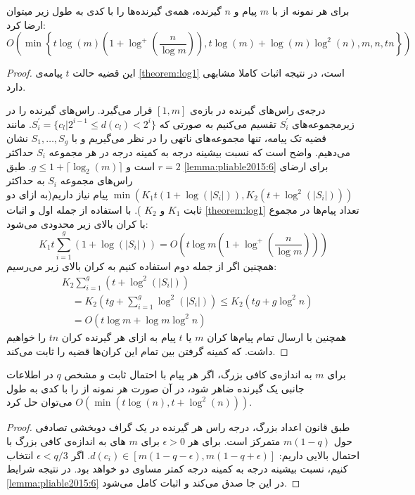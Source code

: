 \begin{theorem}
	\cite{pliable2015paper}
	\label{thm:pliable2015_7}
	برای هر نمونه از
	با
	$m$
	پیام و
	$n$
	گیرنده، همه‌ی گیرنده‌ها را با کدی به طول زیر میتوان ارضا کرد:
	\begin{equation}
		O\left( \min\left\{ t \log(m) (1 + \log^{+}(\dfrac{n}{\log m})), t \log(m) + \log(m) \log^2(n), m, n, tn\right\}\right)
	\end{equation}
\end{theorem}
\begin{proof}
	این قضیه حالت
	$t$
	پیامه‌ی
	\autoref{theorem:log1}
	است، در نتیجه اثبات کاملا مشابهی دارد.
	
	درجه‌ی راس‌های گیرنده در بازه‌ی
	$[1, m]$
	قرار می‌گیرد. راس‌های گیرنده را در زیرمجموعه‌های
	$S_i^{'}$
	تقسیم می‌کنیم به صورتی که
	$S_i^{'} = \{c_l | 2^{i - 1} \leq d(c_l) < 2^i \}$.
	مانند قضیه تک پیامه، تنها مجموعه‌های ناتهی را در نظر می‌گیریم و با
	$S_1, \ldots, S_g$
	نشان می‌دهیم. واضح است که نسبت بیشینه درجه به کمینه درجه در هر مجموعه
	$S_i$
	حداکثر
	$r = 2$
	است و
	$g \leq 1 + \lceil\log_2(m)\rceil$.
	طبق
	\autoref{lemma:pliable2015:6}
	برای ارضای راس‌های مجموعه‌
	$S_i$
	به حداکثر
	$\min (K_1 t (1 + \log(|S_i|)), K_2(t + \log^2(|S_i|)))$
	پیام نیاز داریم(به ازای دو ثابت 
	$K_1$
	و
	$K_2$
	). با استفاده از جمله اول و اثبات
	\autoref{theorem:log1}
	تعداد پیام‌ها در مجموع با کران بالای زیر محدودی می‌شود:
	$$
	K_1 t \sum_{i=1}^g\left(1+\log \left(\left|S_i\right|\right)\right)=O\left(t \log m\left(1+\log ^{+}\left(\frac{n}{\log m}\right)\right)\right)
	$$
	همچنین اگر از جمله دوم استفاده کنیم به کران بالای زیر می‌رسیم:
	$$
	\begin{aligned}
		& K_2 \sum_{i=1}^g\left(t+\log ^2\left(\left|S_i\right|\right)\right) \\
		& \quad=K_2\left(t g+\sum_{i=1}^g \log ^2\left(\left|S_i\right|\right)\right) \leq K_2\left(t g+g \log ^2 n\right) \\
		& \quad=O\left(t \log m+\log m \log ^2 n\right)
	\end{aligned}
	$$
	همچنین با ارسال تمام پیام‌ها کران $m$ یا $t$ پیام به ازای هر گیرنده کران $tn$ را خواهیم داشت. که کمینه گرفتن بین تمام این کران‌ها قضیه را ثابت می‌کند.
\end{proof}

\begin{theorem}
	\cite{pliable2015paper}
	\label{thm:pliable2015_8}
	برای
	$m$
	به اندازه‌ی کافی بزرگ، اگر هر پیام با احتمال ثابت و مشخص 
	$q$
	در اطلاعات جانبی یک گیرنده ضاهر شود، در آن صورت هر نمونه از
	را با کدی به طول
	$O(\min(t \log(n), t + \log^2(n)))$
	می‌توان حل کرد.
\end{theorem}
\begin{proof}
	طبق قانون اعداد بزرگ، درجه راس هر گیرنده در یک گراف دوبخشی تصادفی حول
	$m (1 - q)$
	متمرکز است. برای هر
	$\epsilon > 0$
	برای 
	$m$	های
	به اندازه‌ی کافی بزرگ با احتمال بالایی داریم:
	$d(c_i) \in [m(1 - q - \epsilon), m(1 - q + \epsilon)]$.
	اگر
	$\epsilon < q/3$
	انتخاب کنیم، نسبت بیشینه درجه به کمینه درجه کمتر مساوی دو خواهد بود. در نتیجه شرایط
	\autoref{lemma:pliable2015:6}
	در این جا صدق می‌کند و اثبات کامل می‌شود.
\end{proof}

